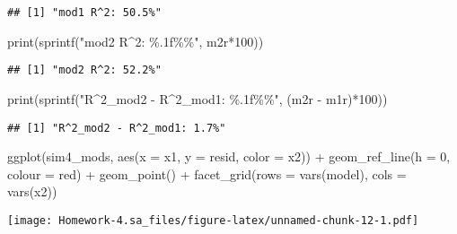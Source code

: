 \documentclass[
]{article}
\newenvironment{Shaded}{\begin{snugshade}}{\end{snugshade}}
\newcommand{\AttributeTok}[1]{\textcolor[rgb]{0.77,0.63,0.00}{#1}}
\newcommand{\DecValTok}[1]{\textcolor[rgb]{0.00,0.00,0.81}{#1}}
\newcommand{\FunctionTok}[1]{\textcolor[rgb]{0.00,0.00,0.00}{#1}}
\newcommand{\NormalTok}[1]{#1}
\newcommand{\SpecialCharTok}[1]{\textcolor[rgb]{0.00,0.00,0.00}{#1}}
\newcommand{\StringTok}[1]{\textcolor[rgb]{0.31,0.60,0.02}{#1}}
\begin{document}
\begin{verbatim}
## [1] "mod1 R^2: 50.5%"
\end{verbatim}

\begin{Shaded}
\begin{Highlighting}[]
\FunctionTok{print}\NormalTok{(}\FunctionTok{sprintf}\NormalTok{(}\StringTok{"mod2 R\^{}2: \%.1f\%\%"}\NormalTok{, m2r}\SpecialCharTok{*}\DecValTok{100}\NormalTok{))}
\end{Highlighting}
\end{Shaded}

\begin{verbatim}
## [1] "mod2 R^2: 52.2%"
\end{verbatim}

\begin{Shaded}
\begin{Highlighting}[]
\FunctionTok{print}\NormalTok{(}\FunctionTok{sprintf}\NormalTok{(}\StringTok{"R\^{}2\_mod2 {-} R\^{}2\_mod1: \%.1f\%\%"}\NormalTok{, (m2r }\SpecialCharTok{{-}}\NormalTok{ m1r)}\SpecialCharTok{*}\DecValTok{100}\NormalTok{))}
\end{Highlighting}
\end{Shaded}

\begin{verbatim}
## [1] "R^2_mod2 - R^2_mod1: 1.7%"
\end{verbatim}

\begin{Shaded}
\begin{Highlighting}[]
\FunctionTok{ggplot}\NormalTok{(sim4\_mods, }\FunctionTok{aes}\NormalTok{(}\AttributeTok{x =}\NormalTok{ x1, }\AttributeTok{y =}\NormalTok{ resid, }\AttributeTok{color =}\NormalTok{ x2)) }\SpecialCharTok{+}
  \FunctionTok{geom\_ref\_line}\NormalTok{(}\AttributeTok{h =} \DecValTok{0}\NormalTok{, }\AttributeTok{colour =} \StringTok{\textquotesingle{}red\textquotesingle{}}\NormalTok{) }\SpecialCharTok{+}
  \FunctionTok{geom\_point}\NormalTok{() }\SpecialCharTok{+}
  \FunctionTok{facet\_grid}\NormalTok{(}\AttributeTok{rows =} \FunctionTok{vars}\NormalTok{(model), }\AttributeTok{cols =} \FunctionTok{vars}\NormalTok{(x2))}
\end{Highlighting}
\end{Shaded}

\texttt{[image: Homework-4.sa\_files/figure-latex/unnamed-chunk-12-1.pdf]}
\end{document}
